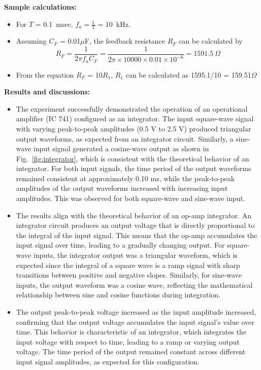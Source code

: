 \documentclass[11pt]{scrreprt}
\begin{document}
\noindent\textbf{Sample calculations:}\\
\begin{itemize}
    \item For $T$ = 0.1~msec, $f_a = \frac{1}{T}$ = 10~kHz.
    \item Assuming $C_F$ = 0.01$\mu$F, the feedback resistance $R_F$ can be calculated by
    \begin{equation}
        R_F = \frac{1}{2\pi f_a C_F} = \frac{1}{2\pi \times 10000\times 0.01\times 10^{-6}} = 1591.5~\Omega
    \end{equation}
    \item From the equation $R_F$ = 10$R_1$, $R_1$ can be calculated as 1595.1/10 = 159.51$\Omega$
\end{itemize}

\noindent\textbf{ Results and discussions:}
\begin{itemize}
\item The experiment successfully demonstrated the operation of an operational amplifier (IC 741) configured as an integrator. The input square-wave signal with varying peak-to-peak amplitudes (0.5 V to 2.5 V) produced triangular output waveforms, as expected from an integrator circuit. Similarly, a sine-wave input signal generated a cosine-wave output as shown in Fig.~\ref{fig:integrator}, which is consistent with the theoretical behavior of an integrator. For both input signals, the time period of the output waveforms remained consistent at approximately 0.10 ms, while the peak-to-peak amplitudes of the output waveforms increased with increasing input amplitudes. This was observed for both square-wave and sine-wave input.
\item The results align with the theoretical behavior of an op-amp integrator. An integrator circuit produces an output voltage that is directly proportional to the integral of the input signal. This means that the op-amp accumulates the input signal over time, leading to a gradually changing output. For square-wave inputs, the integrator output was a triangular waveform, which is expected since the integral of a square wave is a ramp signal with sharp transitions between positive and negative slopes. Similarly, for sine-wave inputs, the output waveform was a cosine wave, reflecting the mathematical relationship between sine and cosine functions during integration.
\item The output peak-to-peak voltage increased as the input amplitude increased, confirming that the output voltage accumulates the input signal's value over time. This behavior is characteristic of an integrator, which integrates the input voltage with respect to time, leading to a ramp or varying output voltage. The time period of the output remained constant across different input signal amplitudes, as expected for this configuration.


\end{itemize}
\end{document}

